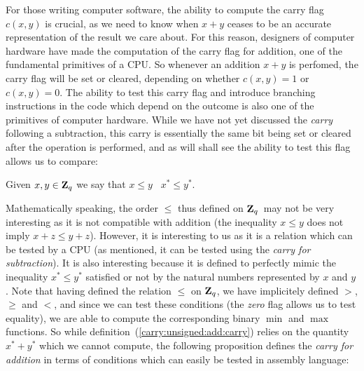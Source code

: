 \documentclass{article}
\newcommand{\zq}{\mbox{${\bf Z}_{q}$}}
\begin{document}
For those writing computer software, the ability to compute the carry flag 
$c(x,y)$ is crucial, as we need to know when $x+y$ ceases to be an accurate 
representation of the result we care about. For this reason, designers of
computer hardware have made the computation of the carry flag for addition, 
one of the fundamental primitives of a CPU. So whenever an addition $x+y$ is
perfomed, the carry flag will be set or cleared, depending on whether 
$c(x,y)=1$ or $c(x,y)=0$. The ability to test this carry flag and introduce
branching instructions in the code which depend on the outcome is also one
of the primitives of computer hardware. While we have not yet discussed 
the {\em carry} following a subtraction, this carry is essentially the same 
bit being set or cleared after the operation is performed, and as will
shall see the ability to test this flag allows us to compare:


\begin{defin}\label{carry:order:zq}
  Given $x,y\in\zq$ we say that $x\leq y$ \ifand\ $x^{*}\leq y^{*}$.
\end{defin}

Mathematically speaking, the order $\leq$ thus defined on \zq\ may 
not be very interesting as it is not compatible with addition 
(the inequality $x\leq y$ does not imply $x+z\leq y+z$). 
However, it is interesting to us as it is 
a relation which can be tested by a CPU (as mentioned, it can
be tested using the {\em carry for subtraction}). It is also 
interesting because it is defined to perfectly mimic the 
inequality $x^{*} \leq y^{*}$ satisfied or not by the natural 
numbers represented by $x$ and $y$. Note that having defined 
the relation $\leq$ on \zq, we have implicitely defined $>$, 
$\geq$ and $<$, and since we can test these conditions
(the {\em zero} flag allows us to test equality), 
we are able to compute the corresponding binary $\min$ and $\max$ 
functions. So while definition~(\ref{carry:unsigned:add:carry}) 
relies on the quantity $x^{*}+y^{*}$ which we cannot compute,
the following proposition defines the {\em carry for addition} in
terms of conditions which can easily be tested in assembly
language:
\end{document}
